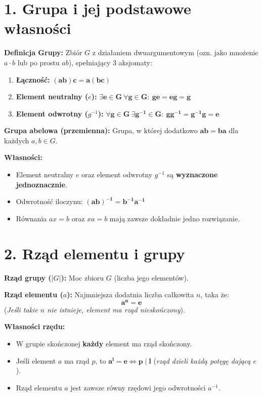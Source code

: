 \documentclass[12pt,a4paper]{article}
\begin{document}
\section*{1. Grupa i jej podstawowe własności}
\noindent\textbf{Definicja Grupy:} Zbiór $G$ z działaniem dwuargumentowym (ozn. jako mnożenie $a \cdot b$ lub po prostu $ab$), spełniający 3 aksjomaty: %
\begin{enumerate}
    \item \textbf{Łączność:} $\mathbf{(ab)c = a(bc)}$ %
    \item \textbf{Element neutralny ($e$):} $\mathbf{\exists e \in G \ \forall g \in G: \ ge = eg = g}$ %
    \item \textbf{Element odwrotny ($g^{-1}$):} $\mathbf{\forall g \in G \ \exists g^{-1} \in G: \ gg^{-1} = g^{-1}g = e}$ %
\end{enumerate}

\noindent\textbf{Grupa abelowa (przemienna):} Grupa, w której dodatkowo $\mathbf{ab = ba}$ dla każdych $a, b \in G$. %

\noindent\textbf{Własności:} %
\begin{itemize}
    \item Element neutralny $e$ oraz element odwrotny $g^{-1}$ są \textbf{wyznaczone jednoznacznie}. %
    \item Odwrotność iloczynu: $\mathbf{(ab)^{-1} = b^{-1}a^{-1}}$ %
    \item Równania $ax=b$ oraz $xa=b$ mają zawsze dokładnie jedno rozwiązanie. %
\end{itemize}

\section*{2. Rząd elementu i grupy}
\noindent\textbf{Rząd grupy ($|G|$):} Moc zbioru $G$ (liczba jego elementów). %

\noindent\textbf{Rząd elementu ($a$):} Najmniejsza dodatnia liczba całkowita $n$, taka że: %
$$ \mathbf{a^n = e} $$ %
(\textit{Jeśli takie $n$ nie istnieje, element ma rząd nieskończony}). %

\noindent\textbf{Własności rzędu:} %
\begin{itemize}
    \item W grupie skończonej \textbf{każdy} element ma rząd skończony. %
    \item Jeśli element $a$ ma rząd $p$, to $\mathbf{a^l = e \iff p \mid l}$ (\textit{rząd dzieli każdą potęgę dającą $e$}). %
    \item Rząd elementu $a$ jest zawsze równy rzędowi jego odwrotności $a^{-1}$. %
\end{itemize}
\end{document}
